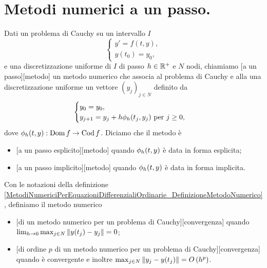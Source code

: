 \section{Metodi numerici a un passo.}
\label{MetodiNumericiPerEquazioniDifferenzialiOrdinarie_MetodiNumericiAUnPasso}
\begin{Definition}
\label{MetodiNumericiPerEquazioniDifferenzialiOrdinarie_DefinizioneMetodoNumerico}
	Dati un problema di Cauchy su un intervallo $I$
	\[
	\begin{cases}
		y' = f(t,y),\\
		y(t_0) = y_0,
	\end{cases}
	\]
	e una discretizzazione uniforme di $I$ di passo $h \in \mathbb{R}^+$ e
  $N$ nodi, chiamiamo
  [a un passo][metodo] un metodo numerico che associa
  al problema di Cauchy e alla una discretizzazione uniforme un vettore
  $(y_j)_{j \in N}$ definito da
	\[
	\begin{cases}
		y_0 = y_0,\\
		y_{j + 1} = y_j + h\phi_h(t_j,y_j)\text{ per }j \geq 0,
	\end{cases}
	\]
	dove $\phi_h(t,y): \operatorname{Dom}{f} \rightarrow \operatorname{Cod}{f}$. Diciamo che il metodo \`e
	\begin{itemize}
		\item {}[a un passo esplicito][metodo]
          quando $\phi_h(t,y)$ \`e data in forma esplicita;
	 	\item {}[a un passo implicito][metodo]
          quando $\phi_h(t,y)$ \`e data in forma implicita.
	\end{itemize}
\end{Definition}
\begin{Definition}
	Con le notazioni della definizione
\ref{MetodiNumericiPerEquazioniDifferenzialiOrdinarie_DefinizioneMetodoNumerico},
	definiamo il metodo numerico
	\begin{itemize}
		\item {}[di un metodo numerico per un problema di Cauchy][convergenza]
          quando $\lim_{\Step \rightarrow 0} \max_{j \in N} \Norm{y(t_j) - y_j} = 0$;
		\item {}[di ordine $p$ di un metodo numerico per un problema di Cauchy][convergenza]
          quando \`e convergente e inoltre
          $\IsBigO{\max_{j \in N} \Norm{y_j - y(t_j)}}{h^p}$.
	\end{itemize}
\end{Definition}
